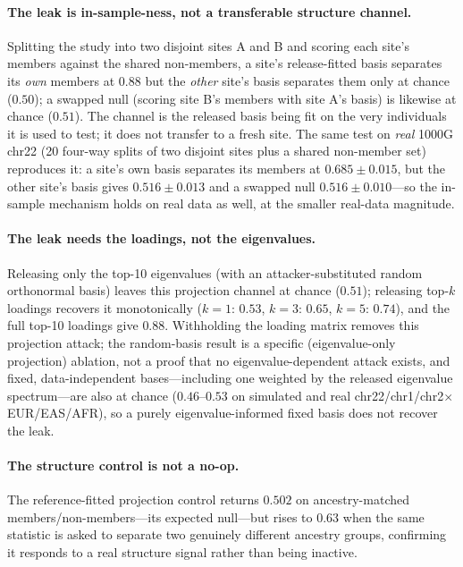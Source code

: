\documentclass[11pt]{article}
\begin{document}
\paragraph{The leak is in-sample-ness, not a transferable structure channel.}
Splitting the study into two disjoint sites A and B and scoring each site's
members against the shared non-members, a site's release-fitted basis separates
its \emph{own} members at $0.88$ but the \emph{other} site's basis separates
them only at chance ($0.50$); a swapped null (scoring site B's members with site
A's basis) is likewise at chance ($0.51$). The channel is the released basis
being fit on the very individuals it is used to test; it does not transfer to a
fresh site. The same test on \emph{real} 1000G chr22 (20 four-way splits of two
disjoint sites plus a shared non-member set) reproduces it: a site's own basis
separates its members at $0.685 \pm 0.015$, but the other site's basis gives
$0.516 \pm 0.013$ and a swapped null $0.516 \pm 0.010$---so the in-sample
mechanism holds on real data as well, at the smaller real-data magnitude.

\paragraph{The leak needs the loadings, not the eigenvalues.} Releasing only the
top-10 eigenvalues (with an attacker-substituted random orthonormal basis)
leaves this projection channel at chance ($0.51$); releasing top-$k$ loadings
recovers it
monotonically ($k{=}1$: $0.53$, $k{=}3$: $0.65$, $k{=}5$: $0.74$), and the full
top-10 loadings give $0.88$. Withholding the loading matrix removes this
projection attack; the random-basis result is a specific (eigenvalue-only
projection) ablation, not a proof that no eigenvalue-dependent attack exists, and
fixed, data-independent bases---including one weighted by the released eigenvalue
spectrum---are also at chance
($0.46$--$0.53$ on simulated and real chr22/chr1/chr2$\times$EUR/EAS/AFR), so
a purely eigenvalue-informed fixed basis does not recover the leak.

\paragraph{The structure control is not a no-op.} The reference-fitted projection
control returns $0.502$ on ancestry-matched members/non-members---its expected
null---but rises to $0.63$ when the same statistic is asked to separate two
genuinely different ancestry groups, confirming it responds to a real structure
signal rather than being inactive.
\end{document}
